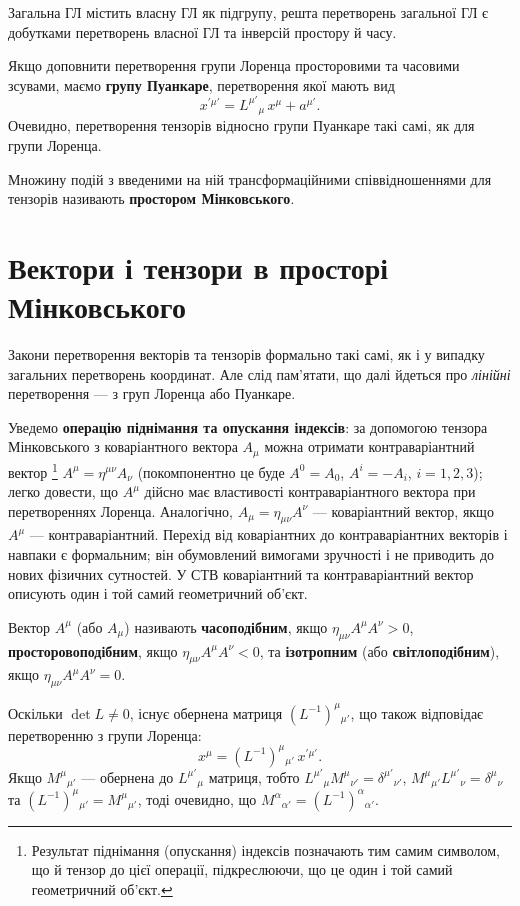\documentclass[%
biblatex,
]{ConspectBook}
\begin{document}
Загальна ГЛ містить власну ГЛ як підгрупу, решта перетворень загальної
ГЛ є добутками перетворень власної ГЛ та інверсій простору й часу.

Якщо доповнити перетворення групи Лоренца просторовими та часовими
зсувами, маємо \textbf{групу Пуанкаре}, перетворення якої мають вид
\[
  x^{\prime\mu'} = L^{\mu'}{}_\mu\, x^\mu + a^{\mu'}.
\]
Очевидно, перетворення тензорів відносно групи Пуанкаре такі самі, як
для групи Лоренца.

Множину подій з введеними на ній трансформаційними співвідношеннями для
тензорів називають \textbf{простором Мінковського}.

\section{Вектори і тензори в просторі Мінковського}

Закони перетворення векторів та тензорів формально такі самі, як і у
випадку загальних перетворень координат. Але слід пам'ятати, що далі
йдеться про \textit{лінійні} перетворення --- з груп Лоренца або Пуанкаре.

Уведемо \textbf{операцію піднімання та опускання індексів}: за допомогою
тензора Мінковського з коваріантного вектора $A_\mu$ можна отримати
контраваріантний вектор%
\footnote{Результат піднімання (опускання) індексів позначають тим самим
символом, що й тензор до цієї операції, підкреслюючи, що це один і той
самий геометричний об'єкт.}
$A^\mu = \eta^{\mu\nu} A_\nu$ (покомпонентно це буде
$A^0 = A_0$, $A^i = -A_i$, $i=1,2,3$); легко довести, що $A^\mu$ дійсно має
властивості контраваріантного вектора при перетвореннях Лоренца.
Аналогічно, $A_\mu = \eta_{\mu\nu} A^\nu$ --- коваріантний вектор, якщо
$A^\mu$ --- контраваріантний. Перехід від коваріантних до контраваріантних
векторів і навпаки є формальним; він обумовлений вимогами зручності і не
приводить до нових фізичних сутностей. У СТВ коваріантний та контраваріантний вектор описують один і той самий геометричний об'єкт.

Вектор $A^\mu$ (або $A_\mu$) називають \textbf{часоподібним}, якщо
$\eta_{\mu\nu}A^\mu A^\nu > 0$, \textbf{просторовоподібним}, якщо
$\eta_{\mu\nu}A^\mu A^\nu < 0$, та \textbf{ізотропним} (або
\textbf{світлоподібним}), якщо $\eta_{\mu\nu}A^\mu A^\nu = 0$.

Оскільки $\det L \ne 0$, існує обернена матриця $(L^{-1})^\mu{}_{\mu'}$,
що також відповідає перетворенню з групи Лоренца:
\[
  x^\mu = (L^{-1})^\mu{}_{\mu'}\, x^{\prime\mu'}.
\]
Якщо $M^\mu{}_{\mu'}$ --- обернена до $L^{\mu'}{}_\mu$ матриця, тобто
$L^{\mu'}{}_\mu M^\mu{}_{\nu'} = \delta^{\mu'}{}_{\nu'}$,
$M^\mu{}_{\mu'} L^{\mu'}{}_\nu = \delta^\mu{}_\nu$ та
$(L^{-1})^\mu{}_{\mu'} = M^\mu{}_{\mu'}$, тоді очевидно, що
$M^\alpha{}_{\alpha'} = (L^{-1})^\alpha{}_{\alpha'}$.
\end{document}
